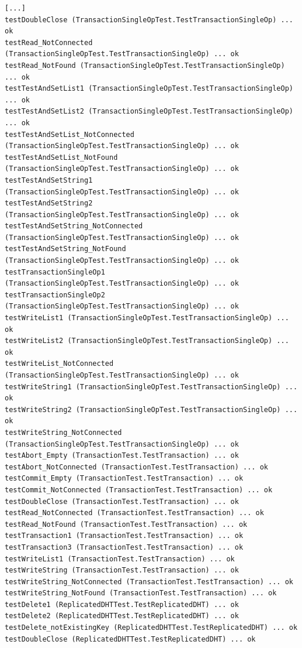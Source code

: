 \documentclass[a4paper]{scrreprt}
\begin{document}
\begin{lstlisting}[language={}]
%> make python-test
[...]
testDoubleClose (TransactionSingleOpTest.TestTransactionSingleOp) ... ok
testRead_NotConnected (TransactionSingleOpTest.TestTransactionSingleOp) ... ok
testRead_NotFound (TransactionSingleOpTest.TestTransactionSingleOp) ... ok
testTestAndSetList1 (TransactionSingleOpTest.TestTransactionSingleOp) ... ok
testTestAndSetList2 (TransactionSingleOpTest.TestTransactionSingleOp) ... ok
testTestAndSetList_NotConnected (TransactionSingleOpTest.TestTransactionSingleOp) ... ok
testTestAndSetList_NotFound (TransactionSingleOpTest.TestTransactionSingleOp) ... ok
testTestAndSetString1 (TransactionSingleOpTest.TestTransactionSingleOp) ... ok
testTestAndSetString2 (TransactionSingleOpTest.TestTransactionSingleOp) ... ok
testTestAndSetString_NotConnected (TransactionSingleOpTest.TestTransactionSingleOp) ... ok
testTestAndSetString_NotFound (TransactionSingleOpTest.TestTransactionSingleOp) ... ok
testTransactionSingleOp1 (TransactionSingleOpTest.TestTransactionSingleOp) ... ok
testTransactionSingleOp2 (TransactionSingleOpTest.TestTransactionSingleOp) ... ok
testWriteList1 (TransactionSingleOpTest.TestTransactionSingleOp) ... ok
testWriteList2 (TransactionSingleOpTest.TestTransactionSingleOp) ... ok
testWriteList_NotConnected (TransactionSingleOpTest.TestTransactionSingleOp) ... ok
testWriteString1 (TransactionSingleOpTest.TestTransactionSingleOp) ... ok
testWriteString2 (TransactionSingleOpTest.TestTransactionSingleOp) ... ok
testWriteString_NotConnected (TransactionSingleOpTest.TestTransactionSingleOp) ... ok
testAbort_Empty (TransactionTest.TestTransaction) ... ok
testAbort_NotConnected (TransactionTest.TestTransaction) ... ok
testCommit_Empty (TransactionTest.TestTransaction) ... ok
testCommit_NotConnected (TransactionTest.TestTransaction) ... ok
testDoubleClose (TransactionTest.TestTransaction) ... ok
testRead_NotConnected (TransactionTest.TestTransaction) ... ok
testRead_NotFound (TransactionTest.TestTransaction) ... ok
testTransaction1 (TransactionTest.TestTransaction) ... ok
testTransaction3 (TransactionTest.TestTransaction) ... ok
testWriteList1 (TransactionTest.TestTransaction) ... ok
testWriteString (TransactionTest.TestTransaction) ... ok
testWriteString_NotConnected (TransactionTest.TestTransaction) ... ok
testWriteString_NotFound (TransactionTest.TestTransaction) ... ok
testDelete1 (ReplicatedDHTTest.TestReplicatedDHT) ... ok
testDelete2 (ReplicatedDHTTest.TestReplicatedDHT) ... ok
testDelete_notExistingKey (ReplicatedDHTTest.TestReplicatedDHT) ... ok
testDoubleClose (ReplicatedDHTTest.TestReplicatedDHT) ... ok

\end{lstlisting}
\end{document}
